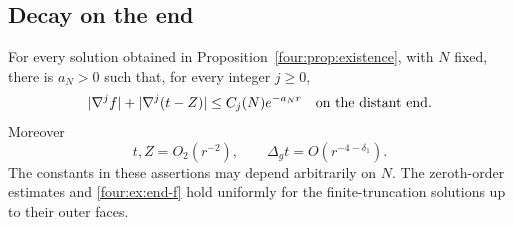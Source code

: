 \subsection{Decay on the end}

\begin{lemma}\label{four:lem:end-decay}
For every solution obtained in Proposition~\ref{four:prop:existence}, with
$N$ fixed, there is $a_N>0$ such that, for every integer $j\ge0$,
\begin{equation}\label{four:ex:end-f}
 |\nabla^jf|+|\nabla^j(t-Z)|\le C_j(N)e^{-a_Nr}
 \quad\hbox{on the distant end}.
\end{equation}
Moreover
\begin{equation}\label{four:ex:end-tz}
 t,Z=O_2(r^{-2}),\qquad \Delta_gt=O(r^{-4-\delta_1}).
\end{equation}
The constants in these assertions may depend arbitrarily on $N$.
The zeroth-order estimates and \eqref{four:ex:end-f} hold uniformly for the
finite-truncation solutions up to their outer faces.
\end{lemma}

